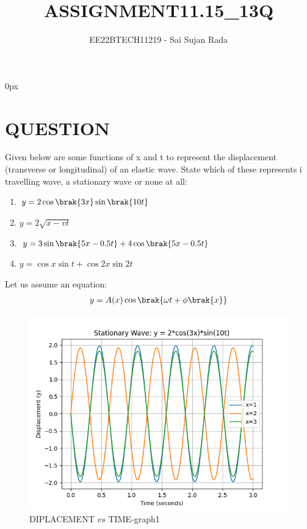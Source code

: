 \documentclass[journal,12pt,twocolumn]{IEEEtran}
\theoremstyle{remark}
\begin{document}
\parindent 0px

\title{ASSIGNMENT11.15\_13Q}
\author{EE22BTECH11219 - Sai Sujan Rada$^{}$%
}
\maketitle
\newpage
\bigskip
\section*{QUESTION}
Given below are some functions of x and t to 
represent the displacement (transverse
or longitudinal) of an elastic wave. State which of these represents \brak i travelling
wave,  a stationary wave or  none at all: \\
\begin{enumerate}
\item $y = 2\cos \brak{3x} \sin \brak{10t}$
\item $y=2\sqrt{x-vt}$
\item $y = 3\sin \brak{5x - 0.5t} + 4\cos \brak{5x - 0.5t}$
\item $y = \cos x \sin t + \cos 2x \sin 2t$
\end{enumerate}
\solution 
\fi
 
\pagebreak
Let us assume an equation:
\begin{align}
y=A(x)\cos \brak{\omega t+\phi\brak {x}}
\end{align}

\pagebreak
\begin{figure}[ht]
                        \centering
                        \includegraphics[width=\columnwidth]{ncert-physics/11.15.13/figs/a.png}
                        \caption{DIPLACEMENT $vs$ TIME-graph1}
                        \label{fig:1}
\end{figure}
\end{document}
